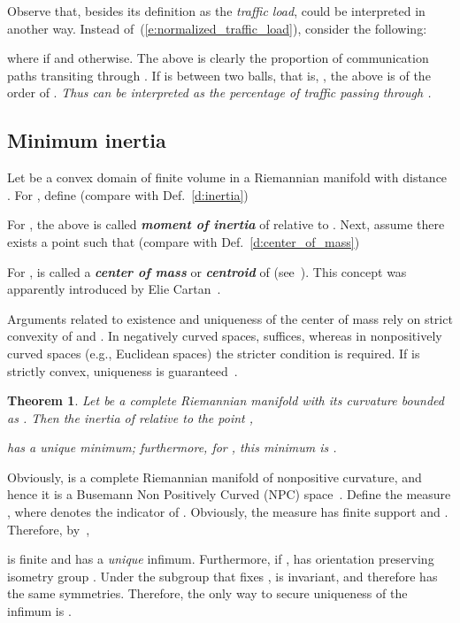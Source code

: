 \documentclass{article}
\newtheorem{theorem}{Theorem}
\newenvironment{proof}
{\noindent {\bf Proof.}}
{}
\begin{document}
Observe that, besides its definition as the {\it traffic load}, 
 could be interpreted in another way. 
Instead of~(\ref{e:normalized_traffic_load}), consider the following:

where  if  and  otherwise. 
The above is clearly the proportion of communication paths transiting through . 
If  is between two balls, that is, , 
the above is of the order of . 
{\it Thus  can be interpreted as the percentage of traffic passing through .} 


\noindent 

\noindent 
\subsection{Minimum inertia  }

Let  be a convex domain of finite volume 
in a Riemannian manifold 
with distance .  
For , define (compare with Def.~\ref{d:inertia})

For , the above is called \textbf{\textit{moment of inertia}} of  relative to . 
Next, assume there exists a point  such that (compare with Def.~\ref{d:center_of_mass})

For ,  is called a \textit{\textbf{center of mass}} or \textit{\textbf{centroid}} 
of  (see~\cite[Def. 3.2.1]{Jost1997}). 
This concept was apparently introduced by Elie Cartan~\cite[p. 47]{Berger2000}. 

Arguments related to existence and uniqueness of the center of mass rely on strict convexity 
of  and . 
In negatively curved spaces,  suffices, 
whereas in nonpositively curved spaces (e.g., Euclidean spaces) the stricter condition  is required. 
If  is strictly convex, uniqueness is guaranteed~\cite[Lemma 3.1.1]{Jost1997}. 


\noindent 
\begin{theorem}
\label{t:min_inertia}
Let  be a complete Riemannian manifold with its curvature bounded as 
. 
Then the inertia of  relative to the point ,
 
has a unique minimum; furthermore, for , this minimum is . 
\end{theorem}

\begin{proof} 
Obviously,  is a complete Riemannian manifold of nonpositive curvature, 
and hence it is a Busemann Non Positively Curved (NPC) space~\cite[page 45]{Jost1997}. 
Define the measure , 
where  denotes the indicator of . 
Obviously, the measure  has finite support and . 
Therefore, by~\cite[Th. 3.2.1]{Jost1997},

is finite and has a {\it unique} infimum. Furthermore, if , 
 has orientation preserving isometry group . 
Under the subgroup that fixes ,  is invariant, 
and therefore  has the same symmetries. 
Therefore, the only way to secure uniqueness of the infimum is . 


\end{proof}
\end{document}
